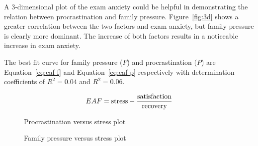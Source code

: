 \documentclass[12pt]{report}
\begin{document}
\begin{multicols}{2}
A 3-dimensional plot of the exam anxiety could be helpful in demonstrating
the relation between procrastination and family pressure. Figure~\ref{fig:3d}
shows a greater correlation between the two factors and exam anxiety, but family
pressure is clearly more dominant. The increase of both factors results in a
noticeable increase in exam anxiety.

The best fit curve for family pressure ($F$) and procrastination ($P$) are
Equation~\ref{eq:eaf-f} and Equation~\ref{eq:eaf-p} respectively with
determination coefficients of $R^2 = 0.04$ and $R^2 = 0.06$.

\begin{equation}
    EAF = \textnormal{stress} -
    \frac{\textnormal{satisfaction}}{\textnormal{recovery}}
    \label{eq:exam-anxiety}
\end{equation}

\begin{figure}[H]
    \caption{Procrastination versus stress plot}
    \label{fig:procrastination-stress}
\end{figure}

\begin{figure}[H]
    \caption{Family pressure versus stress plot}
    \label{fig:family-stress}
\end{figure}


\end{multicols}
\end{document}
